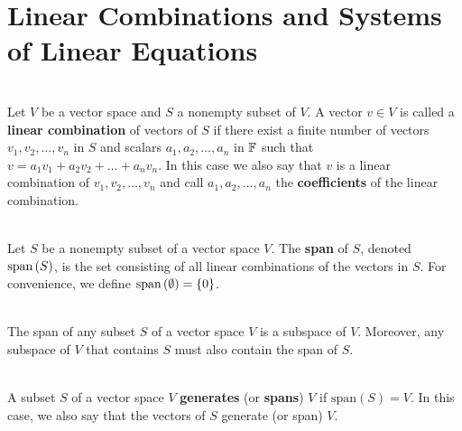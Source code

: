 \section{Linear Combinations and Systems of Linear Equations}

\begin{definition}
	\hfill\\
	Let $V$ be a vector space and $S$ a nonempty subset of $V$. A vector $v \in V$ is called a \textbf{linear combination} of vectors of $S$ if there exist a finite number of vectors $v_1, v_2, \dots, v_n$ in $S$ and scalars $a_1, a_2, \dots, a_n$ in $\mathbb{F}$ such that $v=a_1v_1 + a_2v_2 + \dots + a_nv_n$. In this case we also say that $v$ is a linear combination of $v_1, v_2, \dots, v_n$ and call $a_1, a_2, \dots, a_n$ the \textbf{coefficients} of the linear combination.
\end{definition}

\begin{definition}
	\hfill\\
	Let $S$ be a nonempty subset of a vector space $V$. The \textbf{span} of $S$, denoted $\text{span}\left(S\right)$, is the set consisting of all linear combinations of the vectors in $S$. For convenience, we define $\text{span}\left(\emptyset\right) = \{0\}$.
\end{definition}

\begin{theorem}
	\hfill\\
	The span of any subset $S$ of a vector space $V$ is a subspace of $V$. Moreover, any subspace of $V$ that contains $S$ must also contain the span of $S$.
\end{theorem}

\begin{definition}
	\hfill\\
	A subset $S$ of a vector space $V$ \textbf{generates} (or \textbf{spans}) $V$ if $\text{span}(S) = V$. In this case, we also say that the vectors of $S$ generate (or span) $V$.
\end{definition}
